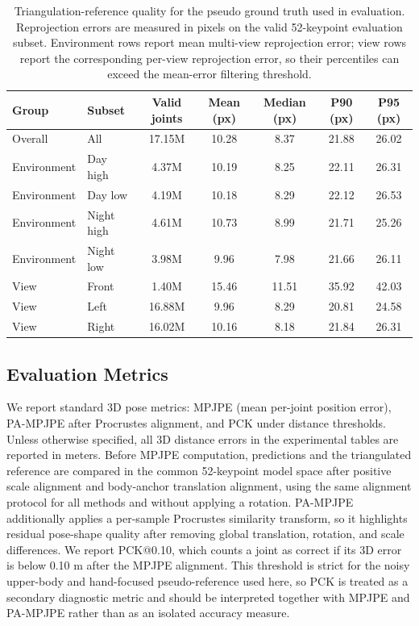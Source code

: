 \documentclass[runningheads]{llncs}
\begin{document}
\begin{table}[t]
\centering
\caption{Triangulation-reference quality for the pseudo ground truth used in evaluation. Reprojection errors are measured in pixels on the valid 52-keypoint evaluation subset. Environment rows report mean multi-view reprojection error; view rows report the corresponding per-view reprojection error, so their percentiles can exceed the mean-error filtering threshold.}
\label{tab:triangulation_quality}
\scriptsize
\setlength{\tabcolsep}{3pt}
\begin{tabular}{llccccc}
\hline
Group & Subset & Valid joints & Mean (px) & Median (px) & P90 (px) & P95 (px) \\
\hline
Overall & All & 17.15M & 10.28 & 8.37 & 21.88 & 26.02 \\
\hline
Environment & Day high & 4.37M & 10.19 & 8.25 & 22.11 & 26.31 \\
Environment & Day low & 4.19M & 10.18 & 8.29 & 22.12 & 26.53 \\
Environment & Night high & 4.61M & 10.73 & 8.99 & 21.71 & 25.26 \\
Environment & Night low & 3.98M & 9.96 & 7.98 & 21.66 & 26.11 \\
\hline
View & Front & 1.40M & 15.46 & 11.51 & 35.92 & 42.03 \\
View & Left & 16.88M & 9.96 & 8.29 & 20.81 & 24.58 \\
View & Right & 16.02M & 10.16 & 8.18 & 21.84 & 26.31 \\
\hline
\end{tabular}
\end{table}

\subsection{Evaluation Metrics}
We report standard 3D pose metrics: MPJPE (mean per-joint position error), PA-MPJPE after Procrustes alignment, and PCK under distance thresholds. Unless otherwise specified, all 3D distance errors in the experimental tables are reported in meters. Before MPJPE computation, predictions and the triangulated reference are compared in the common 52-keypoint model space after positive scale alignment and body-anchor translation alignment, using the same alignment protocol for all methods and without applying a rotation. PA-MPJPE additionally applies a per-sample Procrustes similarity transform, so it highlights residual pose-shape quality after removing global translation, rotation, and scale differences. We report PCK@0.10, which counts a joint as correct if its 3D error is below 0.10 m after the MPJPE alignment. This threshold is strict for the noisy upper-body and hand-focused pseudo-reference used here, so PCK is treated as a secondary diagnostic metric and should be interpreted together with MPJPE and PA-MPJPE rather than as an isolated accuracy measure.
\end{document}
